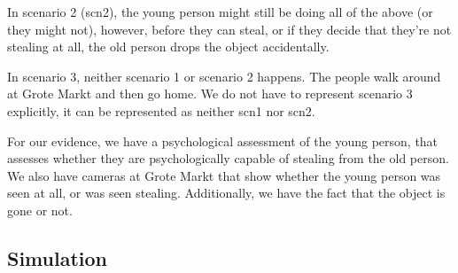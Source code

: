 \documentclass[12pt]{article}
\begin{document}
In scenario 2 (scn2), the young person might still be doing all of the above (or they might not), however, before they can steal, or if they decide that they're not stealing at all, the old person drops the object accidentally.

In scenario 3, neither scenario 1 or scenario 2 happens. The people walk around at Grote Markt and then go home. We do not have to represent scenario 3 explicitly, it can be represented as neither scn1 nor scn2.

For our evidence, we have a psychological assessment of the young person, that assesses whether they are psychologically capable of stealing from the old person. We also have cameras at Grote Markt that show whether the young person was seen at all, or was seen stealing. Additionally, we have the fact that the object is gone or not.





\subsection{Simulation}		%
\end{document}
